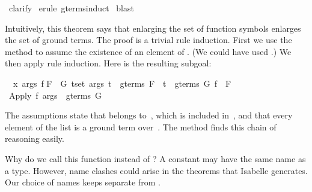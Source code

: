 \begin{isabellebody}
%
\isadelimproof
%
\endisadelimproof
%
\isatagproof
{}\isamarkupfalse%
\ clarify\isanewline
{}\isamarkupfalse%
\ {}erule\ gterms{}induct{}\isanewline
{}\isamarkupfalse%
\ blast\isanewline
{}\isamarkupfalse%
%
\endisatagproof
{\isafoldproof}%
%
\isadelimproof
%
\endisadelimproof
%
\isadelimproof
%
\endisadelimproof
%
\isatagproof
%
\begin{isamarkuptxt}%
Intuitively, this theorem says that
enlarging the set of function symbols enlarges the set of ground 
terms. The proof is a trivial rule induction.
First we use the  method to assume the existence of an element of
.  (We could have used .)  We then
apply rule induction. Here is the resulting subgoal:
\begin{isabelle}%
\ {}{}\ {}x\ args\ f{}\isanewline
{}F\ {}\ G{}\ {}t{}set\ args{}\ t\ {}\ gterms\ F\ {}\ t\ {}\ gterms\ G{}\ f\ {}\ F{}\isanewline
{}\ Apply\ f\ args\ {}\ gterms\ G%
\end{isabelle}
The assumptions state that  belongs 
to~, which is included in~, and that every element of the list  is
a ground term over~.  The  method finds this chain of reasoning easily.%
\end{isamarkuptxt}%
\isamarkuptrue%
%
\endisatagproof
{\isafoldproof}%
%
\isadelimproof
%
\endisadelimproof
%
\begin{isamarkuptext}%
\begin{warn}
Why do we call this function  instead 
of ?  A constant may have the same name as a type.  However,
name  clashes could arise in the theorems that Isabelle generates. 
Our choice of names keeps  separate from 
.
\end{warn}


\end{isamarkuptext}
\end{isabellebody}
